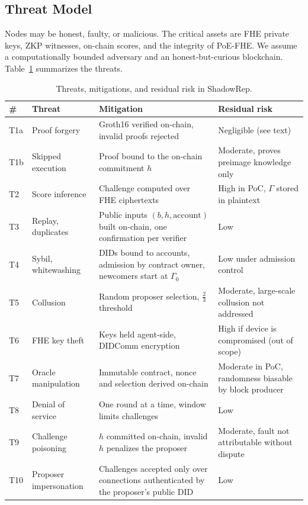\documentclass[conference]{IEEEtran}
\begin{document}
\subsection{Threat Model}\label{sec:threats}
Nodes may be honest, faulty, or malicious. The critical assets are FHE private keys, ZKP witnesses, on-chain scores, and the integrity of PoE-FHE. We assume a computationally bounded adversary and an honest-but-curious blockchain. Table~\ref{tab:threat_model} summarizes the threats.

\begin{table}[t]
\centering
\caption{Threats, mitigations, and residual risk in ShadowRep.}
\label{tab:threat_model}
\footnotesize
\setlength{\tabcolsep}{2.5pt}
\renewcommand{\arraystretch}{1.05}
\begin{tabular}{@{}>{\raggedright}p{0.45cm}>{\raggedright}p{1.85cm}>{\raggedright}p{3.35cm}>{\raggedright\arraybackslash}p{2.35cm}@{}}
\toprule
\textbf{\#} & \textbf{Threat} & \textbf{Mitigation} & \textbf{Residual risk}\\
\midrule
T1a & Proof forgery & Groth16 verified on-chain, invalid proofs rejected & Negligible (see text)\\
T1b & Skipped execution & Proof bound to the on-chain commitment $h$ & Moderate, proves preimage knowledge only\\
T2 & Score inference & Challenge computed over FHE ciphertexts & High in PoC, $\Gamma$ stored in plaintext\\
T3 & Replay, duplicates & Public inputs $(b, h, \text{account})$ built on-chain, one confirmation per verifier & Low\\
T4 & Sybil, whitewashing & DIDs bound to accounts, admission by contract owner, newcomers start at $\Gamma_0$ & Low under admission control\\
T5 & Collusion & Random proposer selection, $\frac{2}{3}$ threshold & Moderate, large-scale collusion not addressed\\
T6 & FHE key theft & Keys held agent-side, DIDComm encryption & High if device is compromised (out of scope)\\
T7 & Oracle manipulation & Immutable contract, nonce and selection derived on-chain & Moderate in PoC, randomness biasable by block producer\\
T8 & Denial of service & One round at a time, window limits challenges & Low\\
T9 & Challenge poisoning & $h$ committed on-chain, invalid $h$ penalizes the proposer & Moderate, fault not attributable without dispute\\
T10 & Proposer impersonation & Challenges accepted only over connections authenticated by the proposer's public DID & Low\\
\bottomrule
\end{tabular}
\end{table}
\end{document}
